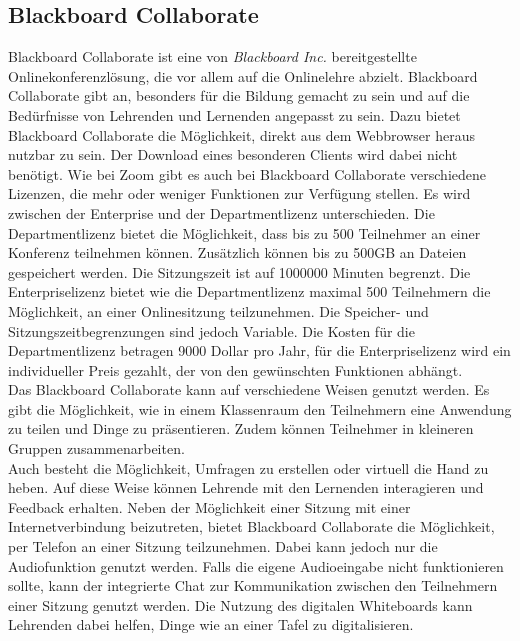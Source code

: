 \subsection{Blackboard Collaborate}
Blackboard Collaborate ist eine von \textit{Blackboard Inc.} bereitgestellte Onlinekonferenzlösung, die vor allem auf die Onlinelehre abzielt.
\autocite[Vgl.][]{M_Blackboard.o.J.}
Blackboard Collaborate gibt an, besonders für die Bildung gemacht zu sein und auf die Bedürfnisse von Lehrenden und Lernenden angepasst zu sein.
Dazu bietet Blackboard Collaborate die Möglichkeit, direkt aus dem Webbrowser heraus nutzbar zu sein.
Der Download eines besonderen Clients wird dabei nicht benötigt.
Wie bei Zoom gibt es auch bei Blackboard Collaborate verschiedene Lizenzen, die mehr oder weniger Funktionen zur Verfügung stellen.
Es wird zwischen der Enterprise und der Departmentlizenz unterschieden.
Die Departmentlizenz bietet die Möglichkeit, dass bis zu 500 Teilnehmer an einer Konferenz teilnehmen können.
Zusätzlich können bis zu 500GB an Dateien gespeichert werden. Die Sitzungszeit ist auf 1000000 Minuten begrenzt.
Die Enterpriselizenz bietet wie die Departmentlizenz maximal 500 Teilnehmern die Möglichkeit, an einer Onlinesitzung teilzunehmen.
Die Speicher- und Sitzungszeitbegrenzungen sind jedoch Variable.
Die Kosten für die Departmentlizenz betragen 9000 Dollar pro Jahr, für die Enterpriselizenz wird ein individueller Preis gezahlt, der von den gewünschten Funktionen abhängt.
\autocite[Vgl.][]{M_Blackboard.o.J.}
\\
Das Blackboard Collaborate kann auf verschiedene Weisen genutzt werden.
Es gibt die Möglichkeit, wie in einem Klassenraum den Teilnehmern eine Anwendung zu teilen und Dinge zu präsentieren.
Zudem können Teilnehmer in kleineren Gruppen zusammenarbeiten.
\autocite[Vgl.][]{M_Blackboard.o.J.}
\\
Auch besteht die Möglichkeit, Umfragen zu erstellen oder virtuell die Hand zu heben.
Auf diese Weise können Lehrende mit den Lernenden interagieren und Feedback erhalten.
Neben der Möglichkeit einer Sitzung mit einer Internetverbindung beizutreten, bietet Blackboard Collaborate die Möglichkeit, per Telefon an einer Sitzung teilzunehmen.
Dabei kann jedoch nur die Audiofunktion genutzt werden.
Falls die eigene Audioeingabe nicht funktionieren sollte, kann der integrierte Chat zur Kommunikation zwischen den Teilnehmern einer Sitzung genutzt werden.
Die Nutzung des digitalen Whiteboards kann Lehrenden dabei helfen, Dinge wie an einer Tafel zu digitalisieren.
\autocite[Vgl.][]{M_NorthernIllinoisUniversity.o.J.}

